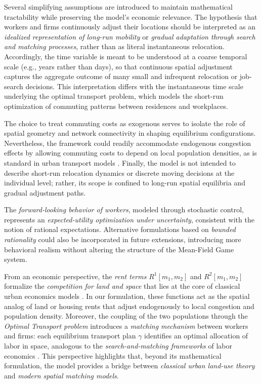 \documentclass[smallextended,referee,envcountsect,]{svjour3}
\begin{document}
\begin{remark}
Several simplifying assumptions are introduced to maintain mathematical tractability while preserving the model’s economic relevance.
The hypothesis that workers and firms continuously adjust their locations should be interpreted as an \emph{idealized representation of long-run mobility} or \emph{gradual adaptation through search and matching processes}, rather than as literal instantaneous relocation. Accordingly, the time variable is meant to be understood at a coarse temporal scale (e.g., years rather than days), so that continuous spatial adjustment captures the aggregate outcome of many small and infrequent relocation or job-search decisions. This interpretation differs with the instantaneous time scale underlying the optimal transport problem, which models the short-run optimization of commuting patterns between residences and workplaces.

The choice to treat commuting costs as exogenous serves to isolate the role of spatial geometry and network connectivity in shaping equilibrium configurations. Nevertheless, the framework could readily accommodate endogenous congestion effects by allowing commuting costs to depend on local population densities, as is standard in urban transport models \cite{SmallVerhoef2007}.
Finally, the model is not intended to describe short-run relocation dynamics or discrete moving decisions at the individual level; rather, its scope is confined to long-run spatial equilibria and gradual adjustment paths.



The \emph{forward-looking behavior of workers}, modeled through stochastic control, represents an \emph{expected-utility optimization under uncertainty}, consistent with the notion of rational expectations. 
Alternative formulations based on \emph{bounded rationality} \cite{Simon1955,Manski1993,camillimarchi} could also be incorporated in future extensions, introducing more behavioral realism without altering the structure of the Mean-Field Game system. 

From an economic perspective, the \emph{rent terms} \( R^1[m_1,m_2] \) and \( R^2[m_1,m_2] \) formalize the \emph{competition for land and space} that lies at the core of classical urban economics models \cite{Alonso1964,Mills1967,Muth1969,GlaeserGyourko2005}. 
In our formulation, these functions act as the spatial analog of land or housing rents that adjust endogenously to local congestion and population density. 
Moreover, the coupling of the two populations through the \emph{Optimal Transport problem} introduces a \emph{matching mechanism} between workers and firms: each equilibrium transport plan \( \gamma \) identifies an optimal allocation of labor in space, analogous to the \emph{search-and-matching frameworks} of labor economics \cite{ShimerSmith2000}. 
This perspective highlights that, beyond its mathematical formulation, the model provides a bridge between \emph{classical urban land-use theory} and \emph{modern spatial matching models}.
\end{remark}
\end{document}
